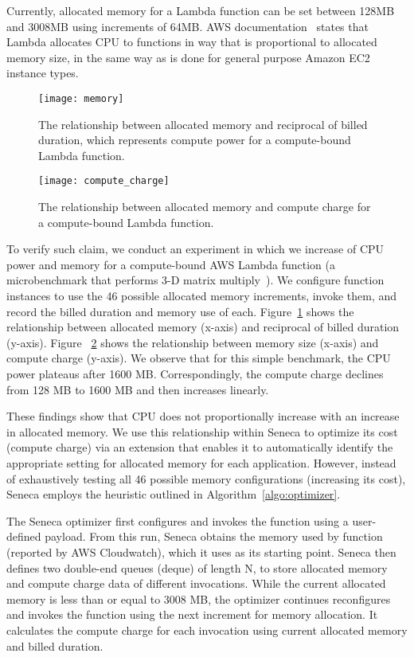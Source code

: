 Currently, allocated memory for a Lambda function can be set
between 128MB and 3008MB using increments of 64MB.
AWS documentation~\cite{ref:lambdalimits} states that Lambda 
allocates CPU to functions in way that is proportional to allocated memory size,
in the same way as is done for general purpose Amazon EC2 instance types.

\begin{figure}[t] \centering 
\texttt{[image: memory]}
\caption{The relationship between allocated memory and reciprocal of billed duration, which represents compute power for a compute-bound Lambda function.
\label{fig:memory}}
\end{figure}

\begin{figure}[t] \centering 
\texttt{[image: compute\_charge]}
\caption{The relationship between allocated memory and compute charge for a compute-bound Lambda function.
\label{fig:compute_charge}}
\end{figure}


To verify such claim, we conduct an experiment in which
we increase of CPU power and memory for a compute-bound 
AWS Lambda function (a microbenchmark that performs 3-D matrix multiply~\cite{ref:matrix}).
We configure function instances to use the 46 possible allocated 
memory increments, invoke them, and record the billed duration and memory
use of each.
Figure~\ref{fig:memory} shows the relationship between allocated memory (x-axis) and reciprocal of billed duration (y-axis). 
Figure ~\ref{fig:compute_charge} shows the relationship between memory 
size (x-axis) and compute charge (y-axis). 
We observe that for this simple benchmark,
the CPU power plateaus after 1600 MB. 
Correspondingly, the compute charge declines from 128 MB to 1600 MB 
and then increases linearly. 


These findings show that CPU does not proportionally increase with
an increase in allocated memory.  We use this relationship within
Seneca to optimize its cost (compute charge) via an extension
that enables it to automatically identify the appropriate
setting for allocated memory for each application.
However, instead of exhaustively testing all 46 possible 
memory configurations (increasing its cost), 
Seneca employs the heuristic outlined in
Algorithm~\ref{algo:optimizer}. 

The Seneca optimizer first configures and invokes the function using 
a user-defined payload.  From this run, Seneca obtains the memory 
used by function (reported by AWS Cloudwatch), 
which it uses as its starting point.
Seneca then defines two double-end queues 
(deque) of length N, to store 
allocated memory and compute charge data of different
invocations. While the current 
allocated memory is less than or equal to 3008 MB, 
the optimizer continues reconfigures and invokes the function 
using the next increment for memory allocation.  It 
calculates the compute charge for each invocation 
using current allocated memory and billed duration. 


